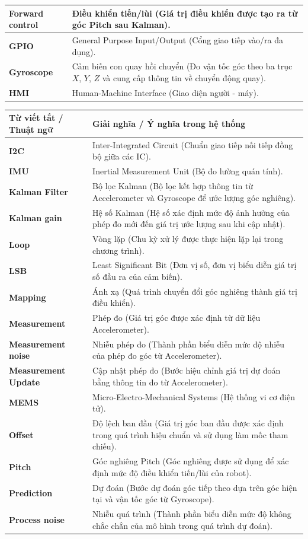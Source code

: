 \begin{tabular}{|p{4.3cm}|p{10.7cm}|}
\textbf{Forward control} & Điều khiển tiến/lùi (Giá trị điều khiển được tạo ra từ góc Pitch sau Kalman). \\ \hline
\textbf{GPIO} & General Purpose Input/Output (Cổng giao tiếp vào/ra đa dụng). \\ \hline
\textbf{Gyroscope} & Cảm biến con quay hồi chuyển (Đo vận tốc góc theo ba trục $X$, $Y$, $Z$ và cung cấp thông tin về chuyển động quay). \\ \hline
\textbf{HMI} & Human-Machine Interface (Giao diện người - máy). \\ \hline
\end{tabular}

\newpage
\noindent
\begin{tabular}{|p{4.3cm}|p{10.7cm}|}
\hline
\textbf{Từ viết tắt / Thuật ngữ} & \textbf{Giải nghĩa / Ý nghĩa trong hệ thống} \\
\hline
\textbf{I2C} & Inter-Integrated Circuit (Chuẩn giao tiếp nối tiếp đồng bộ giữa các IC). \\ \hline
\textbf{IMU} & Inertial Measurement Unit (Bộ đo lường quán tính). \\ \hline
\textbf{Kalman Filter} & Bộ lọc Kalman (Bộ lọc kết hợp thông tin từ Accelerometer và Gyroscope để ước lượng góc nghiêng). \\ \hline
\textbf{Kalman gain} & Hệ số Kalman (Hệ số xác định mức độ ảnh hưởng của phép đo mới đến giá trị ước lượng sau khi cập nhật). \\ \hline
\textbf{Loop} & Vòng lặp (Chu kỳ xử lý được thực hiện lặp lại trong chương trình). \\ \hline
\textbf{LSB} & Least Significant Bit (Đơn vị số, đơn vị biểu diễn giá trị số đầu ra của cảm biến). \\ \hline
\textbf{Mapping} & Ánh xạ (Quá trình chuyển đổi góc nghiêng thành giá trị điều khiển). \\ \hline
\textbf{Measurement} & Phép đo (Giá trị góc được xác định từ dữ liệu Accelerometer). \\ \hline
\textbf{Measurement noise} & Nhiễu phép đo (Thành phần biểu diễn mức độ nhiễu của phép đo góc từ Accelerometer). \\ \hline
\textbf{Measurement Update} & Cập nhật phép đo (Bước hiệu chỉnh giá trị dự đoán bằng thông tin đo từ Accelerometer). \\ \hline
\textbf{MEMS} & Micro-Electro-Mechanical Systems (Hệ thống vi cơ điện tử). \\ \hline
\textbf{Offset} & Độ lệch ban đầu (Giá trị góc ban đầu được xác định trong quá trình hiệu chuẩn và sử dụng làm mốc tham chiếu). \\ \hline
\textbf{Pitch} & Góc nghiêng Pitch (Góc nghiêng được sử dụng để xác định mức độ điều khiển tiến/lùi của robot). \\ \hline
\textbf{Prediction} & Dự đoán (Bước dự đoán góc tiếp theo dựa trên góc hiện tại và vận tốc góc từ Gyroscope). \\ \hline
\textbf{Process noise} & Nhiễu quá trình (Thành phần biểu diễn mức độ không chắc chắn của mô hình trong quá trình dự đoán). \\ \hline
\end{tabular}

